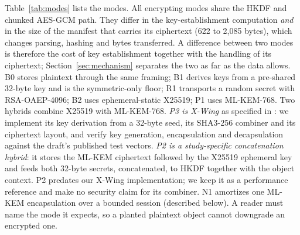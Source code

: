 \documentclass[conference]{IEEEtran}
\begin{document}
Table~\ref{tab:modes} lists the modes. All encrypting modes share the HKDF and chunked AES-GCM
path. They differ in the key-establishment computation \emph{and} in the size of the manifest
that carries its ciphertext (622 to 2{,}085 bytes), which changes parsing, hashing and bytes
transferred. A difference between two modes is therefore the cost of key establishment together
with the handling of its ciphertext; Section~\ref{sec:mechanism} separates the two as far as
the data allows. B0 stores plaintext through the same
framing; B1 derives keys from a pre-shared 32-byte key and is the symmetric-only floor; R1
transports a random secret with RSA-OAEP-4096; B2 uses ephemeral-static X25519; P1 uses
ML-KEM-768. Two hybrids combine X25519 with ML-KEM-768. \emph{P3 is X-Wing} as specified in
\cite{xwing}: we implement its key derivation from a 32-byte seed, its SHA3-256 combiner and its
ciphertext layout, and verify key generation, encapsulation and decapsulation against the
draft's published test vectors. \emph{P2 is a study-specific concatenation hybrid}: it stores the
ML-KEM ciphertext followed by the X25519 ephemeral key and feeds both 32-byte secrets,
concatenated, to HKDF together with the object context. P2 predates our X-Wing implementation; we
keep it as a performance reference and make no security claim for its combiner. N1 amortizes one
ML-KEM encapsulation over a bounded session (described below). A reader must name the
mode it expects, so a planted plaintext object cannot downgrade an encrypted one.

\begin{table}[t]
\caption{Key-establishment modes. Sizes in bytes; the per-object value is what every object's manifest carries.}
\label{tab:modes}
\centering\footnotesize
\setlength{\tabcolsep}{3pt}
\end{table}
\end{document}
